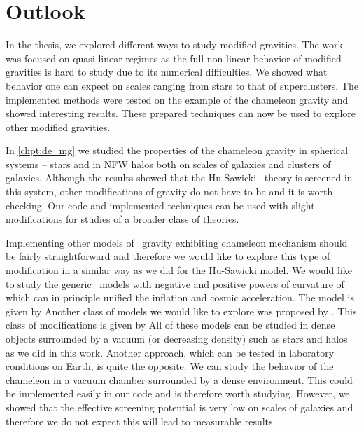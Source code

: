\chapter{Outlook}
\label{chpt:outlook}
In the thesis, we explored different ways to study modified gravities. The work was focused on quasi-linear regimes as the full non-linear behavior of modified gravities is hard to study due to its numerical difficulties. We showed what behavior one can expect on scales ranging from stars to that of superclusters. The implemented methods were tested on the example of the chameleon gravity and showed interesting results. These prepared techniques can now be used to explore other modified gravities.

In \autoref{chpt:de_mg} we studied the properties of the chameleon gravity in spherical systems -- stars and in NFW halos both on scales of galaxies and clusters of galaxies. Although the results showed that the Hu-Sawicki \fR\ theory is screened in this system, other modifications of gravity do not have to be and it is worth checking. Our code and implemented techniques can be used with slight modifications for studies of a broader class of theories.

Implementing other models of \fR\ gravity exhibiting chameleon mechanism should be fairly straightforward and therefore we would like to explore this type of modification in a similar way as we did for the Hu-Sawicki model. We would like to study the generic \fR\ models with negative and positive powers of curvature of \textcite{2003PhRvD..68l3512N} which can in principle unified the inflation and cosmic acceleration. The model is given by
Another class of models we would like to explore was proposed by \textcite{2007JETPL..86..157S}. This class of modifications is given by
All of these models can be studied in dense objects surrounded by a vacuum (or decreasing density) such as stars and halos as we did in this work. Another approach, which can be tested in laboratory conditions on Earth, is quite the opposite. We can study the behavior of the chameleon in a vacuum chamber surrounded by a dense environment. This could be implemented easily in our code and is therefore worth studying. However, we showed that the effective screening potential is very low on scales of galaxies and therefore we do not expect this will lead to measurable results.


